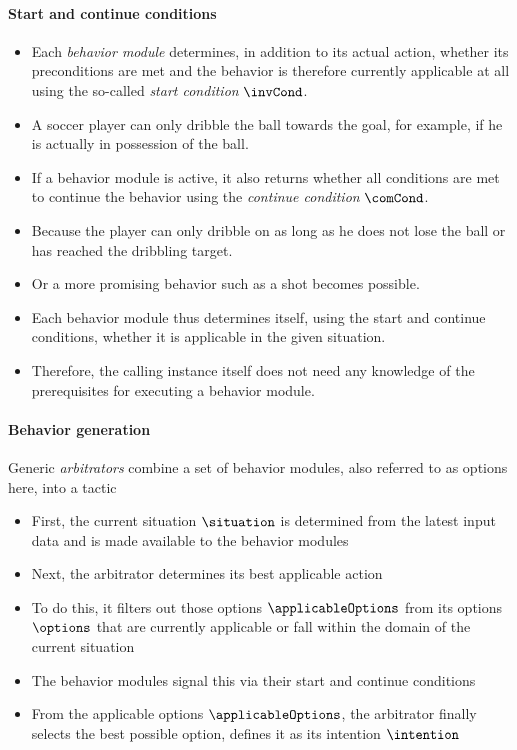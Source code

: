 \paragraph*{Start and continue conditions}
\begin{itemize}
    \item Each \emph{behavior module} determines, in addition to its actual action, whether its preconditions are met and the behavior is therefore currently applicable at all using the so-called \emph{start condition} $\invCond$.
    \item A soccer player can only dribble the ball towards the goal, for example, if he is actually in possession of the ball.
    \item If a behavior module is active, it also returns whether all conditions are met to continue the behavior using the \emph{continue condition} $\comCond$.
    \item Because the player can only dribble on as long as he does not lose the ball or has reached the dribbling target.
    \item Or a more promising behavior such as a shot becomes possible.
    \item Each behavior module thus determines itself, using the start and continue conditions, whether it is applicable in the given situation.
    \item Therefore, the calling instance itself does not need any knowledge of the prerequisites for executing a behavior module.
\end{itemize}


\paragraph*{Behavior generation}
Generic \emph{arbitrators} combine a set of behavior modules, also referred to as options here, into a tactic
\begin{itemize}
\item First, the current situation $\situation$ is determined from the latest input data and is made available to the behavior modules
\item Next, the arbitrator determines its best applicable action
\item To do this, it filters out those options $\applicableOptions$ from its options $\options$ that are currently applicable or fall within the domain of the current situation
\item The behavior modules signal this via their start and continue conditions

\item From the applicable options $\applicableOptions$, the arbitrator finally selects the best possible option, defines it as its intention $\intention$
\end{itemize}

